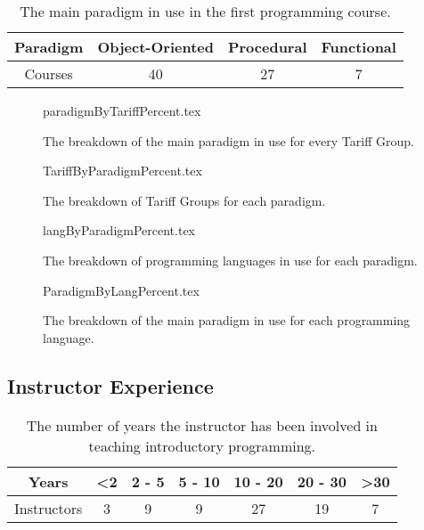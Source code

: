 \documentclass{sig-alternate}
\begin{document}
\begin{table}[]
\centering
\caption{The main paradigm in use in the first programming course.}
\label{tab:paradigm}
\begin{tabular}{cccc}
\hline
Paradigm & Object-Oriented & Procedural & Functional \\ \hline
Courses  & 40              & 27         & 7          \\ \hline
\end{tabular}
\end{table}

\clearpage

\begin{figure}
\begin{center}
{paradigmByTariffPercent.tex}
\end{center}
\caption{The breakdown of the main paradigm in use for every Tariff Group.}
\end{figure}

\begin{figure}
\begin{center}
{TariffByParadigmPercent.tex}
\end{center}
\caption{The breakdown of Tariff Groups for each paradigm.}
\end{figure}

\begin{figure}
\begin{center}
{langByParadigmPercent.tex}
\end{center}
\caption{The breakdown of programming languages in use for each paradigm.}
\end{figure}


\begin{figure}
\begin{center}
{ParadigmByLangPercent.tex}
\end{center}
\caption{The breakdown of the main paradigm in use for each programming language.}
\end{figure}

\subsection{Instructor Experience}

\begin{table}[]
\centering
\caption{The number of years the instructor has been involved in teaching introductory programming.}
\label{tab:yearsTeaching}
\begin{tabular}{ccccccc}
\hline
Years       & \textless 2 & 2 - 5 & 5 - 10 & 10 - 20 & 20 - 30 & \textgreater 30 \\ \hline
Instructors & 3          & 9     & 9      & 27      & 19      & 7              \\ \hline
\end{tabular}
\end{table}
\end{document}
